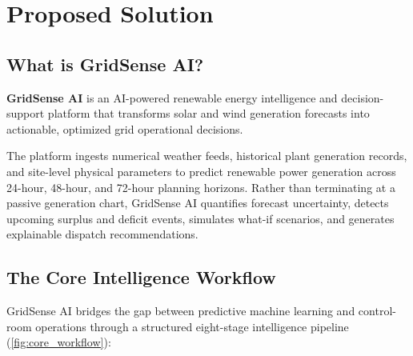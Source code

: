 \section{Proposed Solution}
\label{sec:proposed_solution}

\subsection{What is GridSense AI?}
\label{subsec:what_is_gridsense}

\textbf{GridSense AI} is an AI-powered renewable energy intelligence and decision-support platform that transforms solar and wind generation forecasts into actionable, optimized grid operational decisions.

The platform ingests numerical weather feeds, historical plant generation records, and site-level physical parameters to predict renewable power generation across 24-hour, 48-hour, and 72-hour planning horizons. Rather than terminating at a passive generation chart, GridSense AI quantifies forecast uncertainty, detects upcoming surplus and deficit events, simulates what-if scenarios, and generates explainable dispatch recommendations.

\subsection{The Core Intelligence Workflow}
\label{subsec:core_workflow}

GridSense AI bridges the gap between predictive machine learning and control-room operations through a structured eight-stage intelligence pipeline (\cref{fig:core_workflow}):

